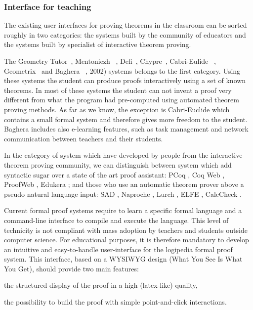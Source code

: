 \subsubsection*{Interface for teaching}

The existing user interfaces for proving theorems in the classroom can be sorted roughly in two categories: 
the systems built by the community of educators and the systems built by specialist of interactive theorem proving.

The Geometry Tutor~\cite{anderson_geometry_1985}, Mentoniezh ~\cite{py_reconnaissance_1990},
Defi~\cite{ag-almouloud_ordinateur_1992}, Chypre~\cite{bernat_chypre:_1993}, Cabri-Eulide ~\cite{luengo_cabri-euclide:_1997}, Geometrix~\cite{gressier_geometrix_1988}  and Baghera ~\cite{balacheff_baghera_1999},
2002) systems belongs to the first category. Using these systems the
student can produce proofs interactively using a set of known theorems.
In most of these systems the student can not invent a proof very different
from what the program had pre-computed using automated theorem
proving methods. As far as we know, the exception is Cabri-Euclide
which contains a small formal system and therefore gives more freedom
to the student. Baghera includes also e-learning features, such as task
management and network communication between teachers and their
students.

In the category of system which have developed by people from the interactive theorem proving community, we can distinguish between system which add syntactic sugar over a state of the art proof assistant:
PCoq \cite{amerkad_mathematics_2001}, Coq Web \cite{blanc_proofs_2007}, ProofWeb \cite{kaliszyk_deduction_2008}, Edukera \cite{rognier_presentation_2016}; and those who use an automatic theorem prover above a pseudo natural language input:
SAD \cite{lyaletski_sad_2006}, Naproche \cite{cramer_naproche_2010}, Lurch \cite{carter_lurch:_nodate}, ELFE \cite{dore_elfe_2018}, CalcCheck \cite{kahl_calccheck:_2018}.

Current formal proof systems require to learn a specific formal
language and a command-line interface to compile and execute the
language. This level of technicity is not compliant with mass
adoption by teachers and students outside computer science. For
educational purposes, it is therefore mandatory to develop an
intuitive and easy-to-handle user-interface for the logipedia formal
proof system. This interface, based on a WYSIWYG design (What You See
Is What You Get), should provide two main features:
\begin{compactitem}
\item the structured display of the proof in a high (latex-like) quality,
\item the possibility to build the proof with simple point-and-click
  interactions.
\end{compactitem}

